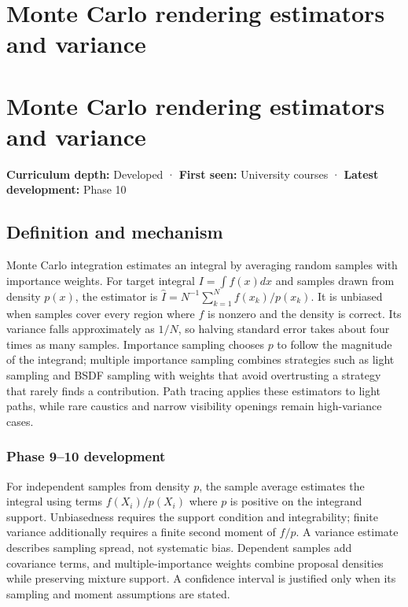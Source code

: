 \hypertarget{appendix-031e02bf28af}{}
\section*{Monte Carlo rendering estimators and variance}
\section{Monte Carlo rendering estimators and variance}\label{appendix-031e02bf28af-monte-carlo-rendering-estimators-and-variance}

\textbf{Curriculum depth:} Developed · \textbf{First seen:} University courses · \textbf{Latest development:} Phase 10

\subsection{Definition and mechanism}\label{appendix-031e02bf28af-definition-and-mechanism}

Monte Carlo integration estimates an integral by averaging random samples with importance weights. For target integral \(I=\int f(x)dx\) and samples drawn from density \(p(x)\), the estimator is \(\hat I=N^{-1}\sum_{k=1}^N f(x_k)/p(x_k)\). It is unbiased when samples cover every region where \(f\) is nonzero and the density is correct. Its variance falls approximately as \(1/N\), so halving standard error takes about four times as many samples. Importance sampling chooses \(p\) to follow the magnitude of the integrand; multiple importance sampling combines strategies such as light sampling and BSDF sampling with weights that avoid overtrusting a strategy that rarely finds a contribution. Path tracing applies these estimators to light paths, while rare caustics and narrow visibility openings remain high-variance cases.

\subsubsection{Phase 9--10 development}\label{appendix-031e02bf28af-phase-910-development}

For independent samples from density \(p\), the sample average estimates the integral using terms \(f(X_i)/p(X_i)\) where \(p\) is positive on the integrand support. Unbiasedness requires the support condition and integrability; finite variance additionally requires a finite second moment of \(f/p\). A variance estimate describes sampling spread, not systematic bias. Dependent samples add covariance terms, and multiple-importance weights combine proposal densities while preserving mixture support. A confidence interval is justified only when its sampling and moment assumptions are stated.

